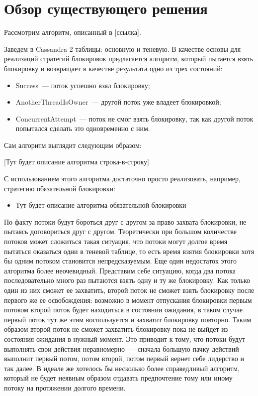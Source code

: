 \section{Обзор существующего решения}

Рассмотрим алгоритм, описанный в [ссылка].

Заведем в Cassandra 2 таблицы: основную и теневую. В качестве основы для реализаций стратегий блокировок предлагается алгоритм, который пытается взять блокировку и возвращает в качестве результата одно из трех состояний:

\begin{itemize}
	\item Success~--- поток успешно взял блокировку;
	\item AnotherThreadIsOwner~--- другой поток уже владеет блокировкой;
	\item ConcurrentAttempt~--- поток не смог взять блокировку, так как другой поток попытался сделать это одновременно с ним.
\end{itemize}

Сам алгоритм выглядит следующим образом:

[Тут будет описание алгоритма строка-в-строку]

С использованием этого алгоритма достаточно просто реализовать, например, стратегию обязательной блокировки:

\begin{itemize}
	\item Тут будет описание алгоритма обязательной блокировки
\end{itemize}

По факту потоки будут бороться друг с другом за право захвата блокировки, не пытаясь договориться друг с другом. Теоретически при большом количестве потоков может сложиться такая ситуация, что потоки могут долгое время пытаться оказаться одни в теневой таблице, то есть время взятия блокировки хотя бы одним потоком становится непредсказуемым. Еще один недостаток этого алгоритма более неочевидный. Представим себе ситуацию, когда два потока последовательно много раз пытаются взять одну и ту же блокировку. Как только один из них сможет ее захватить, второй поток не сможет взять блокировку после первого же ее освобождения: возможно в момент отпускания блокировки первым потоком второй поток будет находиться в состоянии ожидания, в таком случае первый поток тут же этим воспользуется и захватит блокировку повторно. Таким образом второй поток не сможет захватить блокировку пока не выйдет из состояния ожидания в нужный момент. Это приводит к тому, что потоки будут выполнять свои действия неравномерно~--- сначала большую пачку действий выполнит первый потом, потом второй, потом первый вернет себе лидерство и так далее. В идеале же хотелось бы несколько более справедливый алгоритм, который не будет неявным образом отдавать предпочтение тому или иному потоку на протяжении долгого времени.